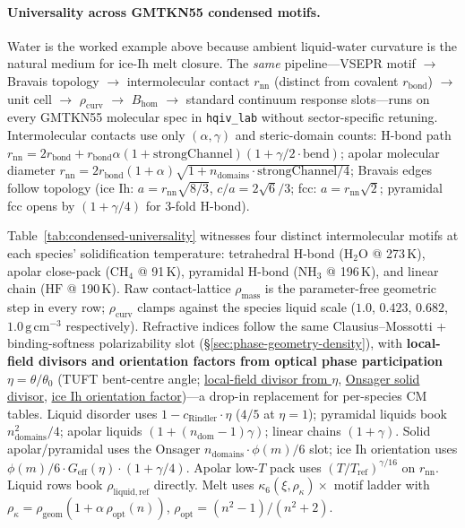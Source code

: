 \documentclass[11pt,notitlepage]{amsart}
\begin{document}
\paragraph{Universality across GMTKN55 condensed motifs.}
\label{sec:condensed-universality}

Water is the worked example above because ambient liquid-water curvature is the
natural medium for ice-Ih melt closure. The \emph{same} pipeline---VSEPR motif
$\rightarrow$ Bravais topology $\rightarrow$ intermolecular contact $r_{\mathrm{nn}}$
(distinct from covalent $r_{\mathrm{bond}}$) $\rightarrow$ unit cell
$\rightarrow$ $\rho_{\mathrm{curv}}$ $\rightarrow$ $B_{\mathrm{hom}}$ $\rightarrow$
standard continuum response slots---runs on every GMTKN55 molecular spec in
\texttt{hqiv\_lab} without sector-specific retuning. Intermolecular contacts use only
$(\alpha,\gamma)$ and steric-domain counts: H-bond path
$r_{\mathrm{nn}}=2r_{\mathrm{bond}}+r_{\mathrm{bond}}\alpha(1+\text{strongChannel})(1+\gamma/2\cdot\text{bend})$;
apolar molecular diameter
$r_{\mathrm{nn}}=2r_{\mathrm{bond}}(1+\alpha)\sqrt{1+n_{\mathrm{domains}}\cdot\text{strongChannel}/4}$;
Bravais edges follow topology (ice Ih: $a=r_{\mathrm{nn}}\sqrt{8/3}$, $c/a=2\sqrt6/3$;
fcc: $a=r_{\mathrm{nn}}\sqrt2$; pyramidal fcc opens by $(1+\gamma/4)$ for 3-fold H-bond).

Table~\ref{tab:condensed-universality} witnesses four distinct intermolecular motifs
at each species' solidification temperature: tetrahedral H-bond ($\mathrm{H_2O}$ @ 273\,K),
apolar close-pack ($\mathrm{CH_4}$ @ 91\,K), pyramidal H-bond ($\mathrm{NH_3}$ @ 196\,K),
and linear chain ($\mathrm{HF}$ @ 190\,K). Raw contact-lattice $\rho_{\mathrm{mass}}$
is the parameter-free geometric step in every row; $\rho_{\mathrm{curv}}$ clamps against
the species liquid scale ($1.0$, $0.423$, $0.682$, $1.0\,\mathrm{g\,cm^{-3}}$ respectively).
Refractive indices follow the same Clausius--Mossotti + binding-softness polarizability slot
(\S\ref{sec:phase-geometry-density}), with \textbf{local-field divisors and orientation factors
from optical phase participation} $\eta=\theta/\theta_0$ (TUFT bent-centre angle;
\hyperref[lean:phase-material-response]{local-field divisor from $\eta$},
\hyperref[lean:phase-material-response]{Onsager solid divisor}, \hyperref[lean:phase-material-response]{ice Ih orientation factor})---a
drop-in replacement for per-species CM tables. Liquid disorder uses $1-c_{\mathrm{Rindler}}\cdot\eta$
($4/5$ at $\eta=1$); pyramidal liquids book $n_{\mathrm{domains}}^2/4$;
apolar liquids $(1+(n_{\mathrm{dom}}-1)\gamma)$; linear chains $(1+\gamma)$.
Solid apolar/pyramidal uses the Onsager $n_{\mathrm{domains}}\cdot\phi(m)/6$
slot; ice Ih orientation uses $\phi(m)/6\cdot G_{\mathrm{eff}}(\eta)\cdot(1+\gamma/4)$.
Apolar low-$T$ pack uses $(T/T_{\mathrm{ref}})^{\gamma/16}$ on $r_{\mathrm{nn}}$.
Liquid rows book $\rho_{\mathrm{liquid,ref}}$ directly.
Melt uses $\kappa_6(\xi,\rho_\kappa)\times$ motif ladder with
$\rho_\kappa=\rho_{\mathrm{geom}}(1+\alpha\,\rho_{\mathrm{opt}}(n))$,
$\rho_{\mathrm{opt}}=(n^2-1)/(n^2+2)$.
\end{document}
